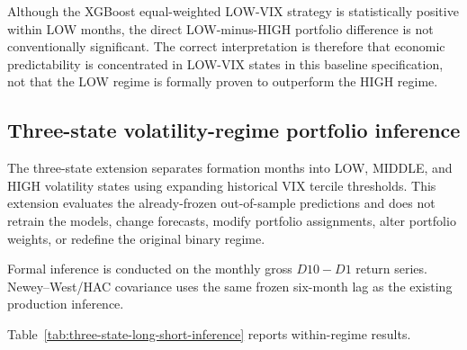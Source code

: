 Although the XGBoost equal-weighted LOW-VIX strategy is statistically positive within LOW months, the direct LOW-minus-HIGH portfolio difference is not conventionally significant. The correct interpretation is therefore that economic predictability is concentrated in LOW-VIX states in this baseline specification, not that the LOW regime is formally proven to outperform the HIGH regime.

\subsection{Three-state volatility-regime portfolio inference}

The three-state extension separates formation months into LOW, MIDDLE, and HIGH volatility states using expanding historical VIX tercile thresholds. This extension evaluates the already-frozen out-of-sample predictions and does not retrain the models, change forecasts, modify portfolio assignments, alter portfolio weights, or redefine the original binary regime.

Formal inference is conducted on the monthly gross $D10-D1$ return series. Newey--West/HAC covariance uses the same frozen six-month lag as the existing production inference.

Table~\ref{tab:three-state-long-short-inference} reports within-regime results.

